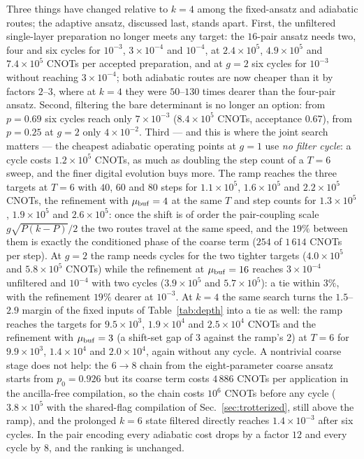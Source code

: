 \documentclass[
  aps,            %
  prc,            %
  reprint,        %
  superscriptaddress,
  floatfix,
  nofootinbib
]{revtex4-2}
\begin{document}
Three things have changed relative to $k=4$ among the fixed-ansatz and
adiabatic routes; the adaptive ansatz, discussed last, stands apart.
First, the unfiltered single-layer preparation no longer meets any target:
the $16$-pair ansatz needs two, four and six cycles for $10^{-3}$,
$3\times10^{-4}$ and $10^{-4}$, at $2.4\times10^{5}$, $4.9\times10^{5}$ and
$7.4\times10^{5}$ CNOTs per accepted preparation, and at $g=2$ six cycles
for $10^{-3}$ without reaching $3\times10^{-4}$; both adiabatic routes are
now cheaper than it by factors $2$--$3$, where at $k=4$ they were
$50$--$130$ times dearer than the four-pair ansatz.  Second, filtering the
bare determinant is no longer an option: from $p=0.69$ six cycles reach
only $7\times10^{-3}$ ($8.4\times10^{5}$ CNOTs, acceptance $0.67$), from
$p=0.25$ at $g=2$ only $4\times10^{-2}$.  Third --- and this is where the
joint search matters --- the cheapest adiabatic operating points at $g=1$
use \emph{no filter cycle}: a cycle costs $1.2\times10^{5}$ CNOTs, as much
as doubling the step count of a $T=6$ sweep, and the finer digital
evolution buys more.  The ramp reaches the three targets at $T=6$ with
$40$, $60$ and $80$ steps for $1.1\times10^{5}$, $1.6\times10^{5}$ and
$2.2\times10^{5}$ CNOTs, the refinement with $\mu_{\rm buf}=4$ at the same
$T$ and step counts for $1.3\times10^{5}$, $1.9\times10^{5}$ and
$2.6\times10^{5}$: once the shift is of order the pair-coupling scale
$g\sqrt{P(k-P)}/2$ the two routes travel at the same speed, and the $19\%$
between them is exactly the conditioned phase of the coarse term ($254$ of
$1\,614$ CNOTs per step).  At $g=2$ the ramp needs cycles for the two
tighter targets ($4.0\times10^{5}$ and $5.8\times10^{5}$ CNOTs) while the
refinement at $\mu_{\rm buf}=16$ reaches $3\times10^{-4}$ unfiltered and
$10^{-4}$ with two cycles ($3.9\times10^{5}$ and $5.7\times10^{5}$): a tie
within $3\%$, with the refinement $19\%$ dearer at $10^{-3}$.  At $k=4$
the same search turns the $1.5$--$2.9$ margin of the fixed inputs of
Table~\ref{tab:depth} into a tie as well: the ramp reaches the targets for
$9.5\times10^{3}$, $1.9\times10^{4}$ and $2.5\times10^{4}$ CNOTs and the
refinement with $\mu_{\rm buf}=3$ (a shift-set gap of $3$ against the
ramp's $2$) at $T=6$ for $9.9\times10^{3}$, $1.4\times10^{4}$ and
$2.0\times10^{4}$, again without any cycle.  A nontrivial coarse stage
does not help: the $6\to8$ chain from the eight-parameter coarse ansatz
starts from $p_0=0.926$ but its coarse term costs $4\,886$ CNOTs per
application in the ancilla-free compilation, so the chain costs $10^{6}$
CNOTs before any cycle ($3.8\times10^{5}$ with the shared-flag compilation
of Sec.~\ref{sec:trotterized}, still above the ramp), and the prolonged
$k=6$ state filtered directly reaches $1.4\times10^{-3}$ after six cycles.
In the pair encoding every adiabatic cost drops by a factor $12$ and every
cycle by $8$, and the ranking is unchanged.
\end{document}
